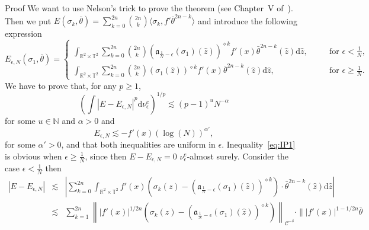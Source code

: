 \documentclass[a4paper,10pt]{article}
\newcommand{\mathd}{\mathrm{d}}
\newenvironment{proof*}[1]{\noindent\textbf{#1\ }}{\hspace*{\fill}$\Box$\medskip}
\begin{document}
\begin{proof*}{Proof}
  We want to use Nelson's trick to prove the theorem (see Chapter~V
  of~{\cite{Simon1974}}). Then we put $E (\sigma_k, \bar{\theta}) = \sum_{k =
  0}^{2 n} \binom{2 n}{k} \langle \sigma_k, f'  \bar{\theta}^{2 n - k}
  \rangle$ and introduce the following expression
  \[ E_{\epsilon, N} (\sigma_1, \bar{\theta}) = \left.
     \left\{\begin{array}{lll}
       \int_{\mathbb{R}^2 \times \mathbb{T}^2} \sum_{k = 0}^{2 n} \binom{2
       n}{k} \left( \mathfrak{a}_{\frac{1}{N} - \epsilon} (\sigma_1) (\hat{z})
       \right)^{\diamond k} f' (x)  \bar{\theta}^{2 n - k} (\hat{z}) \mathd
       \hat{z}, & \quad & \text{for $\epsilon < \frac{1}{N}$,}\\
       \int_{\mathbb{R}^2 \times \mathbb{T}^2} \sum_{k = 0}^{2 n} \binom{2
       n}{k} (\sigma_1 (\hat{z}))^{\diamond k} f' (x)  \bar{\theta}^{2 n - k}
       (\hat{z}) \mathd \hat{z}, &  & \text{for $\epsilon \geqslant
       \frac{1}{N}$.}
     \end{array}\right. \right. \]
  We have to prove that, for any $p \geq 1$,
  \begin{equation}
    \left( \int | E - E_{\epsilon, N} |^p \mathd \nu_{\epsilon}^e \right)^{1 /
    p} \lesssim (p - 1)^u N^{- \alpha} \label{eq:IP1}
  \end{equation}
  for some $u \in \mathbb{N}$ and $\alpha > 0$ and
  \begin{equation}
    E_{\epsilon, N} \lesssim - f' (x) (\log (N))^{\alpha'} \label{eq:IP2},
  \end{equation}
  for some $\alpha' > 0$, and that both inequalities are uniform in
  $\epsilon$. Inequality~{\eqref{eq:IP1}} is obvious when $\epsilon \geqslant
  \frac{1}{N}$, since then $E - E_{\epsilon, N} = 0$ $\nu^e_{\epsilon}$-almost
  surely. Consider the case $\epsilon < \frac{1}{N}$ then
  \begin{eqnarray}
    | E - E_{\epsilon, N} | & \lesssim & \left| \sum_{k = 0}^{2 n}
    \int_{\mathbb{R}^2 \times \mathbb{T}^2} f' (x) \left( \sigma_k (z) -
    \left( \mathfrak{a}_{\frac{1}{N} - \epsilon} (\sigma_1) (\hat{z})
    \right)^{\diamond k} \right) \cdot \bar{\theta}^{2 n - k} (\hat{z}) \mathd
    \hat{z} \right| \nonumber\\
    & \lesssim & \sum_{k = 1}^{2 n} \left\| | f' (x) |^{1 / 2 n} \left(
    \sigma_k (z) - \left( \mathfrak{a}_{\frac{1}{N} - \epsilon} (\sigma_1)
    (\hat{z}) \right)^{\diamond k} \right) \right\|_{\mathcal{C}^{- \delta}}
    \cdot \| | f' (x) |^{1 - 1 / 2 n} \bar{\theta}

\end{eqnarray}
\end{proof*}
\end{document}
